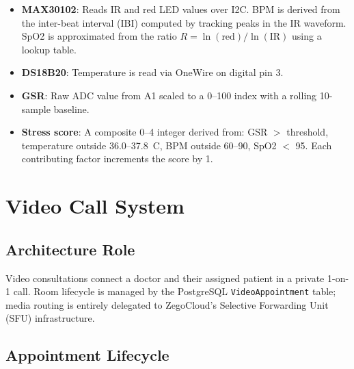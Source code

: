 \documentclass[12pt,a4paper]{report}
\begin{document}
\begin{itemize}[leftmargin=1.5em]
  \item \textbf{MAX30102}: Reads IR and red LED values over I2C.
        BPM is derived from the inter-beat interval (IBI) computed
        by tracking peaks in the IR waveform. SpO2 is approximated
        from the ratio $R = \ln(\text{red})/\ln(\text{IR})$ using a
        lookup table.
  \item \textbf{DS18B20}: Temperature is read via OneWire on digital
        pin 3.
  \item \textbf{GSR}: Raw ADC value from A1 scaled to a 0--100 index
        with a rolling 10-sample baseline.
  \item \textbf{Stress score}: A composite 0--4 integer derived from:
        GSR $>$ threshold, temperature outside 36.0--37.8~\textdegree{}C,
        BPM outside 60--90, SpO2 $<$ 95. Each contributing factor
        increments the score by 1.
\end{itemize}

\section{Video Call System}
\label{sec:video}

\subsection{Architecture Role}

Video consultations connect a doctor and their assigned patient in a
private 1-on-1 call. Room lifecycle is managed by the PostgreSQL
\texttt{VideoAppointment} table; media routing is entirely delegated
to ZegoCloud's Selective Forwarding Unit (SFU) infrastructure.

\subsection{Appointment Lifecycle}
\end{document}
